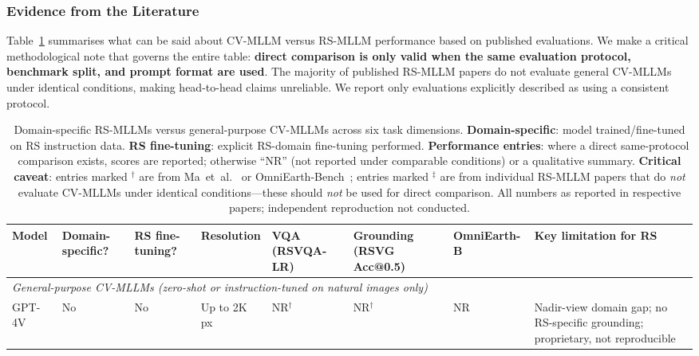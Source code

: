 \subsubsection{Evidence from the Literature}\label{sec6:cvmllm_evidence}

Table~\ref{tab:cvmllm_comparison} summarises what can be said about CV-MLLM versus
RS-MLLM performance based on published evaluations. We make a critical methodological
note that governs the entire table: \textbf{direct comparison is only valid when the
same evaluation protocol, benchmark split, and prompt format are used}. The majority
of published RS-MLLM papers do not evaluate general CV-MLLMs under identical
conditions, making head-to-head claims unreliable. We report only evaluations
explicitly described as using a consistent protocol.

\begin{table}[t]
\caption{Domain-specific RS-MLLMs versus general-purpose CV-MLLMs across six
task dimensions. \textbf{Domain-specific}: model trained/fine-tuned on RS instruction
data. \textbf{RS fine-tuning}: explicit RS-domain fine-tuning performed.
\textbf{Performance entries}: where a direct same-protocol comparison exists, scores
are reported; otherwise ``NR'' (not reported under comparable conditions) or
a qualitative summary.
\textbf{Critical caveat}: entries marked $^\dagger$ are from Ma~et~al.~\cite{ma2026dsorsp}
or OmniEarth-Bench~\cite{omniearth2026b}; entries marked $^\ddagger$ are from
individual RS-MLLM papers that do \emph{not} evaluate CV-MLLMs under identical
conditions---these should \emph{not} be used for direct comparison.
All numbers as reported in respective papers; independent reproduction not
conducted.}\label{tab:cvmllm_comparison}
\tiny\setlength\tabcolsep{2.5pt}
\begin{tabular*}{\textwidth}{@{\extracolsep\fill}p{2.2cm}p{0.9cm}p{0.9cm}p{0.9cm}p{1.4cm}p{1.4cm}p{1.3cm}p{3.0cm}}
\toprule
\textbf{Model} &
\textbf{Domain-specific?} &
\textbf{RS fine-tuning?} &
\textbf{Resolution} &
\textbf{VQA (RSVQA-LR)} &
\textbf{Grounding (RSVG Acc@0.5)} &
\textbf{OmniEarth-B} &
\textbf{Key limitation for RS} \\
\midrule
\multicolumn{8}{l}{\textit{General-purpose CV-MLLMs (zero-shot or instruction-tuned on natural images only)}} \\[2pt]
GPT-4V~\cite{gpt4v2023}
  & No & No & Up to 2K\,px
  & NR$^\dagger$ & NR$^\dagger$ & NR
  & Nadir-view domain gap; no RS-specific grounding; proprietary, not reproducible \\

\end{tabular*}
\end{table}
